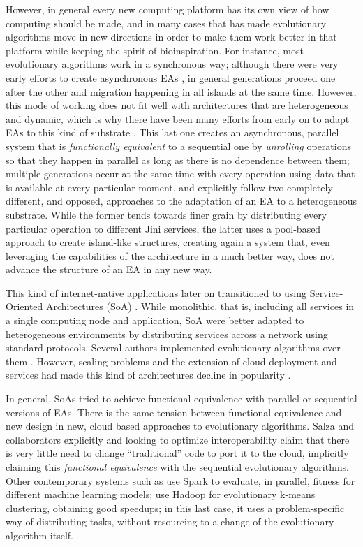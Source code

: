 \documentclass[sigconf]{acmart}
\begin{document}
However, in general every new computing platform has its own view of
how computing should be made, and in many cases that has made
evolutionary algorithms move in new directions in order to make them
work better in that platform while keeping the spirit of
bioinspiration. For instance, most evolutionary algorithms work in a
synchronous way; although there were very early efforts to create
asynchronous EAs \cite{coleman89}, in general 
generations proceed one after the other and migration happening in
all islands at the same time. However, this mode of working does not
fit well with architectures that are heterogeneous and dynamic, which
is why there have been many efforts from early
on to adapt EAs to this kind of substrate
\cite{Jini:FEA2000,zorman2002creation,baugh2003asynchronous}. This
last one creates an asynchronous, parallel system that is {\em functionally
  equivalent} to a sequential one by {\em unrolling} operations so
that they happen in parallel as long as there is no dependence between
them; multiple generations occur at the same time with every operation
using data that is available at every particular
moment. \cite{Jini:FEA2000} and \cite{zorman2002creation} explicitly
follow two completely different, and opposed, approaches to the
adaptation of an EA to a heterogeneous substrate. While the former
tends towards finer grain by distributing every particular operation
to different Jini services, the latter uses a pool-based approach to
create island-like structures, creating again a system that, even
leveraging the capabilities of the architecture in a much better way,
does not advance the  structure of an EA in any new way.

This kind of internet-native applications later on transitioned to
using Service-Oriented Architectures (SoA) \cite{Papazoglou2007}. While monolithic, that is,
including all services in a single computing node and application, SoA
were better adapted to heterogeneous environments by distributing
services across a network using standard protocols. Several authors
implemented evolutionary algorithms over them
\cite{garcia2013service,munawar2010design,6955331}. However, scaling
problems and the extension of cloud deployment and services had made
this kind of architectures decline in popularity
\cite{Varghese2018849}. 

In general, SoAs tried to achieve functional equivalence with parallel
or sequential versions of EAs. There is the same tension between
functional equivalence and new 
design in new, cloud based approaches to evolutionary
algorithms. Salza and collaborators \cite{salza2017ccube,de2017parallel} explicitly
and looking to optimize interoperability claim that there is very
little need to change ``traditional'' code to port it to the cloud,
implicitly claiming this {\em functional equivalence} with the
sequential evolutionary algorithms. Other contemporary systems such as
\cite{10.1007/978-3-319-32149-3_46} use Spark to evaluate, in
parallel, fitness for different machine learning models;
\cite{de2015scalable} use Hadoop for evolutionary k-means clustering,
obtaining good speedups; in this last case, it uses a problem-specific
way of distributing tasks, without resourcing to a change of the
evolutionary algorithm itself. 
\end{document}
